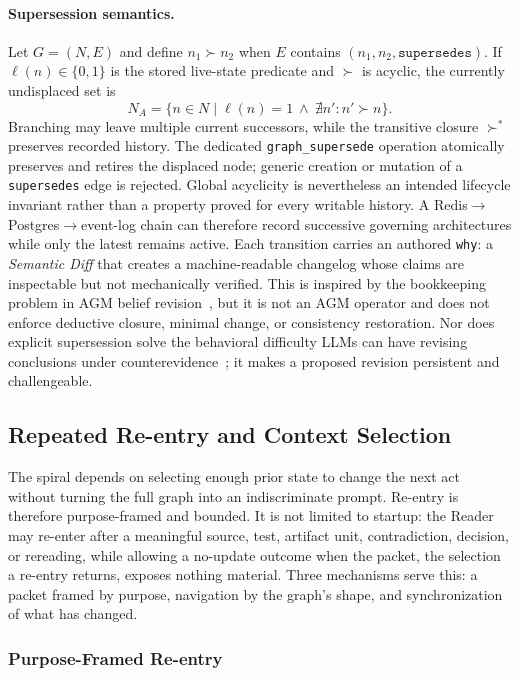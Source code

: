 \paragraph{Supersession semantics.} Let $G=(N,E)$ and define $n_1\succ n_2$ when $E$ contains $(n_1,n_2,\texttt{supersedes})$. If $\ell(n)\in\{0,1\}$ is the stored live-state predicate and $\succ$ is acyclic, the currently undisplaced set is
\[
N_A=\{n\in N\mid \ell(n)=1\ \land\ \nexists n':n'\succ n\}.
\]
Branching may leave multiple current successors, while the transitive closure $\succ^*$ preserves recorded history. The dedicated \texttt{graph\_supersede} operation atomically preserves and retires the displaced node; generic creation or mutation of a \texttt{supersedes} edge is rejected. Global acyclicity is nevertheless an intended lifecycle invariant rather than a property proved for every writable history. A Redis$\rightarrow$Postgres$\rightarrow$event-log chain can therefore record successive governing architectures while only the latest remains active. Each transition carries an authored \texttt{why}: a \emph{Semantic Diff} that creates a machine-readable changelog whose claims are inspectable but not mechanically verified. This is inspired by the bookkeeping problem in AGM belief revision~\cite{alchourron1985agm}, but it is not an AGM operator and does not enforce deductive closure, minimal change, or consistency restoration. Nor does explicit supersession solve the behavioral difficulty LLMs can have revising conclusions under counterevidence~\cite{xu2024belief}; it makes a proposed revision persistent and challengeable.

\subsection{Repeated Re-entry and Context Selection}
\label{sec:reentry}

The spiral depends on selecting enough prior state to change the next act without turning the full graph into an indiscriminate prompt. Re-entry is therefore purpose-framed and bounded. It is not limited to startup: the Reader may re-enter after a meaningful source, test, artifact unit, contradiction, decision, or rereading, while allowing a no-update outcome when the packet, the selection a re-entry returns, exposes nothing material. Three mechanisms serve this: a packet framed by purpose, navigation by the graph's shape, and synchronization of what has changed.

\subsubsection{Purpose-Framed Re-entry}

